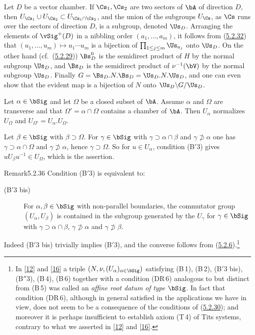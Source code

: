 \documentclass[12pt,a4paper,oneside,english]{smfart}
\makeatletter
\newcommand{\btanchor}[1]{\leavevmode\Hy@raisedlink{\hypertarget{bt:#1}{}}}
\newcommand{\btref}[1]{\hyperlink{bt:#1}{#1}}
\newcommand{\btbib}[1]{\hyperlink{bib:#1}{#1}}
\theoremstyle{definition}
\theoremstyle{bt}
\makeatother
\begin{document}
\btanchor{5.2.34} Let $D$ be a vector chamber. If $\Cs_1,\Cs_2$ are two sectors of
$\bA$ of direction $D$, then
$U_{\Cs_1}\cup U_{\Cs_2}\subset U_{\Cs_1\cap\Cs_2}$, and the union of the
subgroups $U_{\Cs}$, as $\Cs$ runs over the sectors of direction $D$, is a
subgroup, denoted $\Us_{D}$. Arranging the elements of $\vSig^{+}(D)$ in a
nibbling order $(a_1,\dots,a_m)$, it follows from (\btref{5.2.32}) that
$(u_1,\dots,u_m)\mapsto u_1\cdots u_m$ is a bijection of
$\prod_{1\le j\le m}\Us_{a_j}$ onto $\Us_{D}$. On the other hand (cf.\ (\btref{5.2.29}))
$\Bs^{0}_{D}$ is the semidirect product of $H$ by the normal subgroup $\Us_D$,
and $\Bs_D$ is the semidirect product of $\nu^{-1}(\bV)$ by the normal subgroup
$\Us_D$. Finally $G=\Bs_D.N.\Bs_D=\Us_D.N.\Us_D$, and one can even show that the
evident map is a bijection of $N$ onto $\Us_D\backslash G/\Us_D$.

\btanchor{5.2.35} Let $\alpha\in\bSig$ and let $\Omega$ be a closed subset of $\bA$.
Assume $\alpha$ and $\Omega$ are transverse and that $\Omega'=\alpha\cap\Omega$
contains a chamber of $\bA$. Then $U_\alpha$ normalizes $U_\Omega$ and
$U_{\Omega'}=U_\alpha.U_\Omega$.

\begin{sketch}
Let $\beta\in\bSig$ with $\beta\supset\Omega$. For $\gamma\in\bSig$ with
$\gamma\supset\alpha\cap\beta$ and $\gamma\not\supset\alpha$ one has
$\gamma\supset\alpha\cap\Omega$ and $\gamma\not\supset\alpha$, hence
$\gamma\supset\Omega$. So for $u\in U_\alpha$, condition (B$'$3) gives
$uU_\beta u^{-1}\in U_\Omega$, which is the assertion.
\end{sketch}

\begin{stmt}{Remark}{5.2.36}\btanchor{5.2.36}
Condition (B$'$3) is equivalent to:
\begin{description}
\item[\rm (B$'$3 bis)] For $\alpha,\beta\in\bSig$ with non-parallel boundaries,
the commutator group $(U_\alpha,U_\beta)$ is contained in the subgroup generated
by the $U_\gamma$ for $\gamma\in\bSig$ with $\gamma\supset\alpha\cap\beta$,
$\gamma\not\supset\alpha$ and $\gamma\not\supset\beta$.
\end{description}
\end{stmt}
\noindent Indeed (B$'$3 bis) trivially implies (B$'$3), and the converse follows
from (\btref{5.2.6}).\footnote{In [\btbib{12}] and [\btbib{16}] a triple $(N,\nu,(U_\alpha)_{\alpha\in\bSig})$
satisfying (B\,1), (B\,2), (B$'$3 bis), (B$''$3), (B\,4), (B\,6) together with a
condition (DR\,6) analogous to but distinct from (B\,5) was called an
\emph{affine root datum of type $\bSig$}. In fact that condition (DR\,6), although
in general satisfied in the applications we have in view, does not seem to be a
consequence of the conditions of (\btref{5.2.30}); and moreover it is perhaps
insufficient to establish axiom (T\,4) of Tits systems, contrary to what we
asserted in [\btbib{12}] and [\btbib{16}].}
\end{document}
